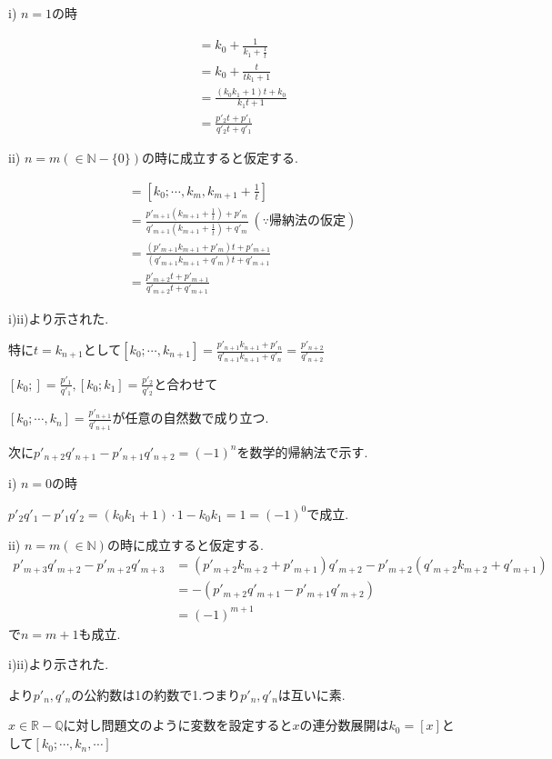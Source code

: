 \documentclass{jsarticle}
\begin{document}
i) $n=1$の時

\begin{align*}
[k_0;k_1,t]&=k_0+\frac{1}{k_1+\frac{1}{t}}\\
&=k_0+\frac{t}{tk_1+1}\\
&=\frac{(k_0k_1+1)t+k_0}{k_1t+1}\\
&=\frac{p'_2t+p'_1}{q'_2t+q'_1}
\end{align*}

ii) $n=m(\in \mathbb{N}-\{0\})$の時に成立すると仮定する.

\begin{align*}
[k_0;\cdots ,k_{m+1},t]&=[k_0;\cdots ,k_{m},k_{m+1}+\frac{1}{t}]\\
&=\frac{p'_{m+1}(k_{m+1}+\frac{1}{t})+p'_m}{q'_{m+1}(k_{m+1}+\frac{1}{t})+q'_m} \ (\because 帰納法の仮定)\\
&=\frac{(p'_{m+1}k_{m+1}+p'_m)t+p'_{m+1}}{(q'_{m+1}k_{m+1}+q'_m)t+q'_{m+1}}\\
&=\frac{p'_{m+2}t+p'_{m+1}}{q'_{m+2}t+q'_{m+1}}
\end{align*}

i)ii)より示された.

特に$t=k_{n+1}$として$[k_0;\cdots ,k_{n+1}]=\frac{p'_{n+1}k_{n+1}+p'_n}{q'_{n+1}k_{n+1}+q'_n}=\frac{p'_{n+2}}{q'_{n+2}}$

$[k_0;]=\frac{p'_1}{q'_1},[k_0;k_1]=\frac{p'_2}{q'_2}$と合わせて

$[k_0;\cdots ,k_n]=\frac{p'_{n+1}}{q'_{n+1}}$が任意の自然数で成り立つ.

次に$p'_{n+2}q'_{n+1}-p'_{n+1}q'_{n+2}=(-1)^n$を数学的帰納法で示す.

i) $n=0$の時

$p'_2q'_1-p'_1q'_2=(k_0k_1+1)\cdot 1-k_0k_1=1=(-1)^0$で成立.

ii) $n=m(\in \mathbb{N})$の時に成立すると仮定する.
\begin{align*}
p'_{m+3}q'_{m+2}-p'_{m+2}q'_{m+3}&=(p'_{m+2}k_{m+2}+p'_{m+1})q'_{m+2}-p'_{m+2}(q'_{m+2}k_{m+2}+q'_{m+1})\\
&=-(p'_{m+2}q'_{m+1}-p'_{m+1}q'_{m+2})\\
&=(-1)^{m+1}
\end{align*}
で$n=m+1$も成立.

i)ii)より示された.

より$p'_n,q'_n$の公約数は1の約数で1.つまり$p'_n,q'_n$は互いに素.

$x\in \mathbb{R}-\mathbb{Q}$に対し問題文のように変数を設定すると$x$の連分数展開は$k_0=[x]$として$[k_0;\cdots,k_n,\cdots]$
\end{document}
